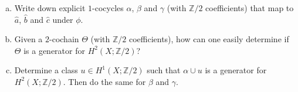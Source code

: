 \documentclass[letterpaper, 12pt]{article}
\begin{document}
\begin{problem}{6}
\begin{enumerate}[(a)]
\item Write down explicit \(1\)-cocycles \(\alpha\), \(\beta\) and \(\gamma\) (with \(\mathbb{Z}/2\) coefficients) that map to \(\hat{a}\), \(\hat{b}\) and \(\hat{c}\) under \(\phi\). 
\item Given a \(2\)-cochain \(\Theta\) (with \(\mathbb{Z}/2\) coefficients), how can one easily determine if \(\Theta\) is a generator for \(H^2(X;\mathbb{Z}/2)\)?
\item Determine a class \(u\in H^1(X;\mathbb{Z}/2)\) such that \(\alpha\cup u\) is a generator for \(H^2(X;\mathbb{Z}/2)\). Then do the same for \(\beta\) and \(\gamma\).
\end{enumerate}
\end{problem}
\end{document}

